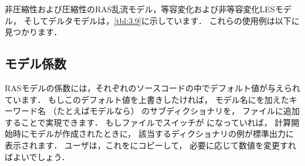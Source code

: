 非圧縮性および圧縮性のRAS乱流モデル，等容変化および非等容変化LESモデル，
そしてデルタモデルは，\autoref{tbl:3.9}に示しています．
これらの使用例は以下に見つかります．




\subsection{モデル係数}
\label{ssec:7.2.1}
RASモデルの係数には，それぞれのソースコードの中でデフォルト値が与えられています．
もしこのデフォルト値を上書きしたければ，
モデル名にを加えたキーワード名
（たとえばモデルなら）
のサブディクショナリを，
ファイルに追加することで実現できます．
もしファイルでスイッチが
になっていれば，
計算開始時にモデルが作成されたときに，
該当するディクショナリの例が標準出力に表示されます．
ユーザは，これをにコピーして，
必要に応じて数値を変更すればよいでしょう．


